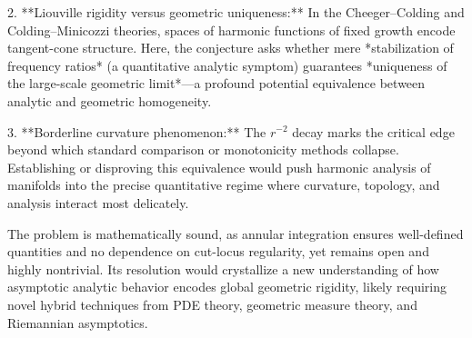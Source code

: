 2. **Liouville rigidity versus geometric uniqueness:** In the Cheeger–Colding and Colding–Minicozzi theories, spaces of harmonic functions of fixed growth encode tangent-cone structure. Here, the conjecture asks whether mere *stabilization of frequency ratios* (a quantitative analytic symptom) guarantees *uniqueness of the large-scale geometric limit*—a profound potential equivalence between analytic and geometric homogeneity.

3. **Borderline curvature phenomenon:** The \(r^{-2}\) decay marks the critical edge beyond which standard comparison or monotonicity methods collapse. Establishing or disproving this equivalence would push harmonic analysis of manifolds into the precise quantitative regime where curvature, topology, and analysis interact most delicately.

The problem is mathematically sound, as annular integration ensures well-defined quantities and no dependence on cut-locus regularity, yet remains open and highly nontrivial.  
Its resolution would crystallize a new understanding of how asymptotic analytic behavior encodes global geometric rigidity, likely requiring novel hybrid techniques from PDE theory, geometric measure theory, and Riemannian asymptotics.